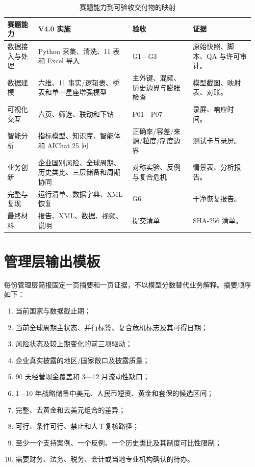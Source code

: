 \documentclass[UTF8,fontset=windows,12pt,openany]{ctexbook}
\begin{document}
\begin{longtable}{p{3.1cm}p{4.1cm}p{3.4cm}p{3.2cm}}
\caption{赛题能力到可验收交付物的映射}\label{tab:competition-map}\\
\toprule
\textbf{赛题能力} & \textbf{V4.0 实施} & \textbf{验收} & \textbf{证据}\\
\midrule
数据接入与处理 & Python 采集、清洗、11 表和 Excel 导入 & G1—G3 & 原始快照、脚本、QA 与许可审计。\\
数据建模 & 六维、11 事实/逻辑表、桥表和单一星座增强模型 & 主外键、混频、历史边界与膨胀检查 & 模型截图、映射表、对账。\\
可视化交互 & 六页、筛选、联动和下钻 & P01—P07 & 录屏、响应时间。\\
智能分析 & 指标模型、知识库、智能体和 AIChat 25 问 & 正确率/容差/来源/粒度/制度边界 & 测试卡与录屏。\\
业务创新 & 企业国别风险、全球周期、历史类比、三层储备和周期协同 & 对称实验、反例与复合危机 & 情景表、分析报告。\\
完整与复现 & 运行清单、数据字典、XML 恢复 & G6 & 干净恢复报告。\\
最终材料 & 报告、XML、数据、视频、说明 & 提交清单 & SHA-256 清单。\\
\bottomrule
\end{longtable}

\chapter{管理层输出模板}

每份管理层简报固定一页摘要和一页证据，不以模型分数替代业务解释。摘要顺序如下：

\begin{enumerate}
  \item 当前国家与数据截止期；
  \item 当前全球周期主状态、并行标签、复合危机标志及其可得日期；
  \item 风险状态及较上期变化的前三项驱动；
  \item 企业真实披露的地区/国家敞口及披露质量；
  \item 90 天经营现金覆盖和 3—12 月流动性缺口；
  \item 1—10 年战略储备中美元、人民币短资、黄金和套保的候选区间；
  \item 完整、去黄金和去美元组合的差异；
  \item 可行、条件可行、禁止和人工复核路径；
  \item 至少一个支持案例、一个反例、一个历史类比及其制度可比性限制；
  \item 需要财务、法务、税务、会计或当地专业机构确认的待办。
\end{enumerate}
\end{document}
